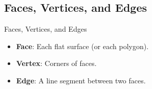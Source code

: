 \subsection{Faces, Vertices, and Edges}
\begin{frame}{Faces, Vertices, and Edges}
    \begin{itemize}
        \item \textbf{Face}: Each flat surface (or each polygon).
        \item \textbf{Vertex}: Corners of faces.
        \item \textbf{Edge}: A line segment between two faces.
    \end{itemize}
    \begin{figure}[H]
        \centering
        
    \end{figure}
\end{frame}
